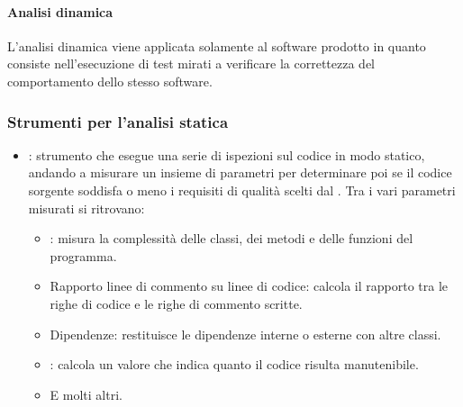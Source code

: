 \paragraph{Analisi dinamica}
L'analisi dinamica viene applicata solamente al software prodotto in quanto consiste nell'esecuzione di test mirati a verificare la correttezza del comportamento dello stesso software.


\subsubsection{Strumenti per l'analisi statica}
\begin{itemize}
  \item \textbf{}: strumento che esegue una serie di ispezioni sul codice in modo statico, andando a misurare un insieme di parametri per determinare poi se il codice sorgente soddisfa o meno i requisiti di qualità scelti dal . Tra i vari parametri misurati si ritrovano:
  \begin{itemize}
    \item \textbf{}: misura la complessità delle classi, dei metodi e delle funzioni del programma.
    \item Rapporto linee di commento su linee di codice: calcola il rapporto tra
    le righe di codice e le righe di commento scritte.
    \item Dipendenze: restituisce le dipendenze interne o esterne con altre
    classi.
    \item \textbf{}: calcola un valore che indica quanto il
    codice risulta manutenibile.
    \item E molti altri.
  \end{itemize}
\end{itemize}

